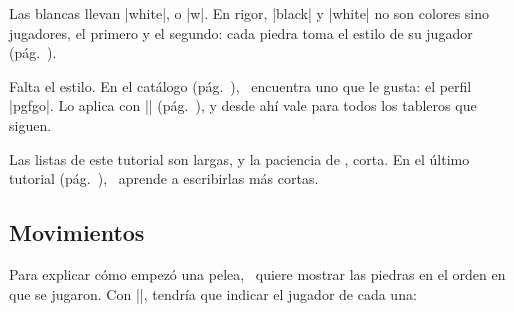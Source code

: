 \begin{goban}
\begin{codeexample}[width=4.8cm]
\begin{goban}[label = {at = {north, west}}]
\end{goban}
\end{codeexample}

Las blancas llevan |white|, o |w|. En rigor, |black| y |white| no son colores sino jugadores, el primero y el segundo: cada piedra toma el estilo de su jugador (pág.~\pageref{sec:jugadores}).

\begin{codeexample}[width=4.8cm]
\begin{goban}[label = {at = {north, west}}]
\end{goban}
\end{codeexample}

Falta el estilo. En el catálogo (pág.~\pageref{sec:catalogo}), \karu\ encuentra uno que le gusta: el perfil |pgfgo|. Lo aplica con || (pág.~\pageref{subsec:perfiles}), y desde ahí vale para todos los tableros que siguen.

\begin{codeexample}[width=4.8cm]

\begin{goban}[label = {at = {north, west}}]
\end{goban}
\end{codeexample}

Las listas de este tutorial son largas, y la paciencia de \karu, corta. En el último tutorial (pág.~\pageref{tut:abreviar}), \karu\ aprende a escribirlas más cortas.

\subsection{Movimientos}
\label{tut:movimientos}

Para explicar cómo empezó una pelea, \karu\ quiere mostrar las piedras en el orden en que se jugaron. Con |\stone|, tendría que indicar el jugador de cada una:

\begin{codeexample}
\begin{goban}
\end{goban}
\end{codeexample}


\end{goban}
